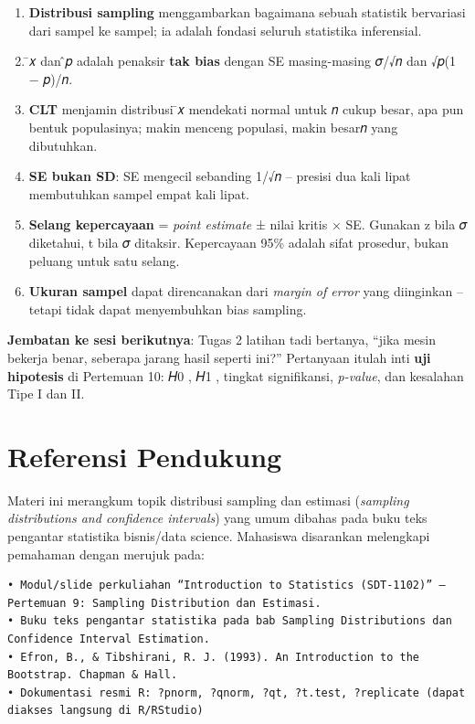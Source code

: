 \documentclass[
  indonesian,
  letterpaper,
]{book}
\providecommand{\tightlist}{%
  \setlength{\itemsep}{0pt}\setlength{\parskip}{0pt}}
\begin{document}
\begin{enumerate}
\def\labelenumi{\arabic{enumi}.}
\tightlist
\item
  \textbf{Distribusi sampling} menggambarkan bagaimana sebuah statistik
  bervariasi dari sampel ke sampel; ia adalah fondasi seluruh statistika
  inferensial.
\item
  ̄𝑥 dan ̂𝑝 adalah penaksir \textbf{tak bias} dengan SE masing-masing
  𝜎/√𝑛 dan √𝑝(1 − 𝑝)/𝑛.
\item
  \textbf{CLT} menjamin distribusi ̄𝑥 mendekati normal untuk 𝑛 cukup
  besar, apa pun bentuk populasinya; makin menceng populasi, makin
  besar𝑛 yang dibutuhkan.
\item
  \textbf{SE bukan SD}: SE mengecil sebanding 1/√𝑛 -- presisi dua kali
  lipat membutuhkan sampel empat kali lipat.
\item
  \textbf{Selang kepercayaan} = \emph{point estimate} ± nilai kritis ×
  SE. Gunakan z bila 𝜎 diketahui, t bila 𝜎 ditaksir. Kepercayaan 95\%
  adalah sifat prosedur, bukan peluang untuk satu selang.
\item
  \textbf{Ukuran sampel} dapat direncanakan dari \emph{margin of error}
  yang diinginkan -- tetapi tidak dapat menyembuhkan bias sampling.
\end{enumerate}

\textbf{Jembatan ke sesi berikutnya}: Tugas 2 latihan tadi bertanya,
``jika mesin bekerja benar, seberapa jarang hasil seperti ini?''
Pertanyaan itulah inti \textbf{uji hipotesis} di Pertemuan 10: 𝐻0 , 𝐻1 ,
tingkat signifikansi, \emph{p-value}, dan kesalahan Tipe I dan II.

\section{Referensi Pendukung}\label{referensi-pendukung}

Materi ini merangkum topik distribusi sampling dan estimasi
(\emph{sampling distributions and confidence intervals}) yang umum
dibahas pada buku teks pengantar statistika bisnis/data science.
Mahasiswa disarankan melengkapi pemahaman dengan merujuk pada:

\begin{verbatim}
• Modul/slide perkuliahan “Introduction to Statistics (SDT-1102)” – Pertemuan 9: Sampling Distribution dan Estimasi.
• Buku teks pengantar statistika pada bab Sampling Distributions dan Confidence Interval Estimation.
• Efron, B., & Tibshirani, R. J. (1993). An Introduction to the Bootstrap. Chapman & Hall.
• Dokumentasi resmi R: ?pnorm, ?qnorm, ?qt, ?t.test, ?replicate (dapat diakses langsung di R/RStudio)
\end{verbatim}
\end{document}
